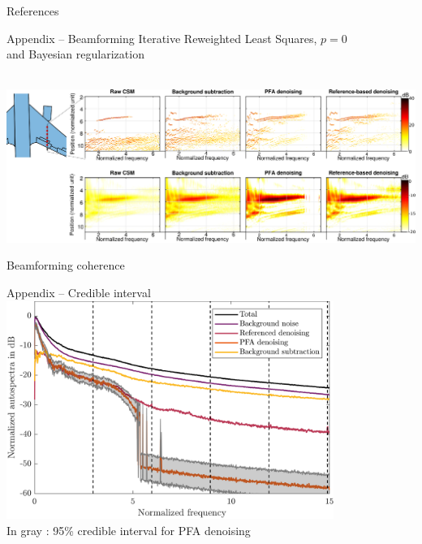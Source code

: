 \documentclass[10pt,xcolor=x11names,compress, show notes]{beamer}%
\begin{document}
\appendix
\setcounter{finalframe}{\value{framenumber}}
\begin{frame}{References}
		\setlength{\bibsep}{2em}
		
		
\end{frame}


\begin{frame}{Appendix -- Beamforming}
	\centering
	\footnotesize Iterative Reweighted Least Squares, $p=0$ \\ and Bayesian regularization\\~\\
	\begin{minipage}{1.1\textwidth}
			\hspace{-0.65cm}\includegraphics[width=1\textwidth]{airbus/imagerie_final.eps}\\
\end{minipage}

	Beamforming coherence

\end{frame}

\begin{frame}{Appendix -- Credible interval}
\centering
\includegraphics[width=0.8\textwidth]{ic_95pc.png}\\
In gray : 95\% credible interval for PFA denoising
\end{frame}
\setcounter{framenumber}{\value{finalframe}}
\end{document}
